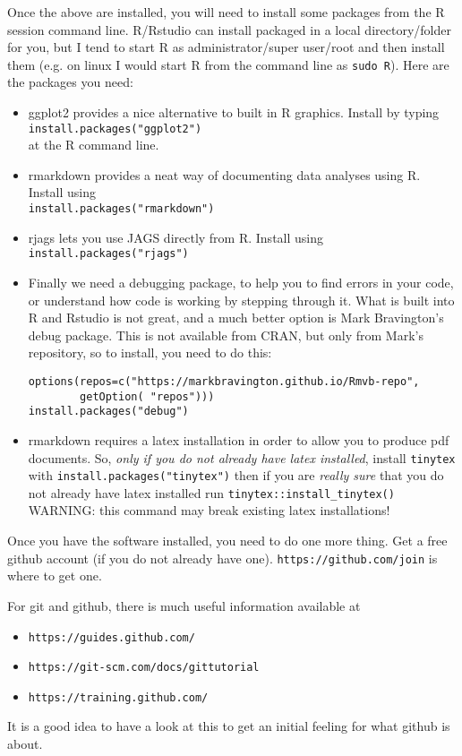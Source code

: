 \documentclass[10pt] {article}
\theoremstyle{definition}
\begin{document}
Once the above are installed, you will need to install some packages from the R session command line. R/Rstudio can install packaged in a local directory/folder for you, but I tend to start R as administrator/super user/root and then install them (e.g. on linux I would start R from the command line as \verb+sudo R+). Here are the packages you need:
\begin{itemize}
\item ggplot2 provides a nice alternative to built in R graphics. Install by typing\\
\verb+install.packages("ggplot2")+\\
at the R command line.
\item rmarkdown provides a neat way of documenting data analyses using R. Install using\\
 \verb+install.packages("rmarkdown")+
\item rjags lets you use JAGS directly from R. Install using\\
 \verb+install.packages("rjags")+
\item Finally we need a debugging package, to help you to find errors in your code, or understand how code is working by stepping through it. What is built into R and Rstudio is not great, and a much better option is Mark Bravington's debug package. This is not available from CRAN, but only from Mark's repository, so to install, you need to do this:
\begin{verbatim}
options(repos=c("https://markbravington.github.io/Rmvb-repo",
        getOption( "repos")))
install.packages("debug")
\end{verbatim}
\item rmarkdown requires a latex installation in order to allow you to produce pdf documents. So, {\em only if you do not already have latex installed}, install {\tt tinytex} with
\verb+install.packages("tinytex")+
then if you are {\em really sure} that you do not already have latex installed run 
\verb+tinytex::install_tinytex()+
WARNING: this command may break existing latex installations!
\end{itemize}
Once you have the software installed, you need to do one more thing. Get a free github account (if you do not already have one).  \verb+https://github.com/join+ is where to get one. 

For git and github, there is much useful information available at 
\begin{itemize}
\item \verb+https://guides.github.com/+
\item \verb+https://git-scm.com/docs/gittutorial+
\item \verb+https://training.github.com/+
\end{itemize}
It is a good idea to have a look at this to get an initial feeling for what github is about.
\end{document}
